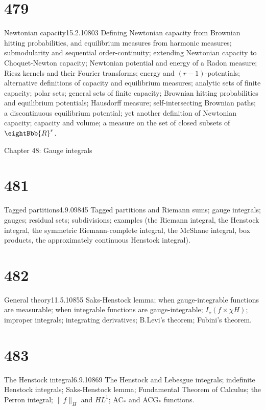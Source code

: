 \section{479}{Newtonian capacity}{15.2.10}{803}{}
{Defining Newtonian capacity from Brownian hitting probabilities, and
equilibrium measures from harmonic measures;  submodularity and
sequential order-continuity;
extending Newtonian capacity to Choquet-Newton capacity;   Newtonian
potential and energy
of a Radon measure;  Riesz kernels and their Fourier transforms;
energy and $(r-1)$-potentials;  alternative definitions of 
capacity and equilibrium measures;  analytic sets of finite capacity;
polar sets;  general sets of finite capacity;
Brownian hitting probabilities and equilibrium potentials;
Hausdorff measure;  self-intersecting Brownian paths;  a discontinuous
equilibrium potential;  yet another definition of Newtonian capacity; 
capacity and volume;  a measure on the set of closed subsets of
$\eightBbb{R}^r$.}



Chapter 48:  Gauge integrals


\section{481}{Tagged partitions}{4.9.09}{845}{}
{Tagged partitions and Riemann sums;  gauge integrals;  gauges;
residual sets;  subdivisions;  examples (the Riemann integral, the
Henstock integral, the symmetric Riemann-complete integral, the McShane
integral, box products, the approximately continuous Henstock
integral).}

\ifdim\pagewidth>467pt\fontdimen3\tenrm=2pt\fi

\section{482}{General theory}{11.5.10}{855}{}
{Saks-Henstock lemma;  when gauge-{\vthsp}integrable functions are 
measurable;  when integrable functions are gauge-integrable;
$I_{\nu}(f\times{\chi}H)$;  improper integrals;
integrating derivatives;  B.Levi's theorem;  Fubini's theorem.}

\tenrm=1.67pt

\section{483}{The Henstock integral}{6.9.10}{869}{}
{The Henstock and Lebesgue integrals;  indefinite Henstock integrals;
Saks-Henstock lemma;  Fundamental Theorem of Calculus;  the Perron
integral;  $\|f\|_H$ and $HL^1$;  AC$_*$ and ACG$_*$ functions.}

